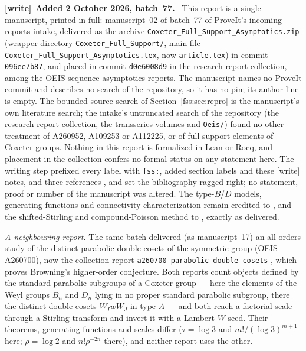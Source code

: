 \documentclass[11pt]{article}
\newenvironment{writenote}[1][]{\par\smallskip\begingroup\small
 \noindent\textbf{[write]}\if\relax\detokenize{#1}\relax\else~\textbf{#1.}\fi\ }%
 {\par\endgroup\smallskip}
\begin{document}
\begin{writenote}[Added 2 October 2026, batch~77]
This report is a single manuscript, printed in full: manuscript~02 of
batch~77 of ProveIt's incoming-reports intake, delivered as the archive
\texttt{Coxeter\_\allowbreak Full\_\allowbreak Support\_\allowbreak Asymptotics.zip} (wrapper directory
\texttt{Coxeter\_\allowbreak Full\_\allowbreak Support/}, main file
\texttt{Coxeter\_\allowbreak Full\_\allowbreak Support\_\allowbreak Asymptotics.tex}, now \texttt{article.tex})
in commit \texttt{096ee7b87}, and placed in commit \texttt{d0e6008d9} in
the research-report collection, among the OEIS-sequence asymptotics
reports. The manuscript names no ProveIt commit and describes no search of
the repository, so it has no pin; its author line is empty. The bounded
source search of Section~\ref{fss:sec:repro} is the manuscript's own
literature search; the intake's untruncated search of the repository (the
research-report collection, the transseries volumes and \texttt{Oeis/})
found no other treatment of A260952, A109253 or A112225, or of full-support
elements of Coxeter groups. Nothing in this report is formalized in Lean or
Rocq, and placement in the collection confers no formal status on any
statement here. The writing step prefixed every label with \texttt{fss:},
added section labels and these \textsf{[write]} notes, and three
references \cite{fss-pdc,fss-tai,fss-cti}, and set the bibliography
ragged-right; no statement, proof or number of
the manuscript was altered. The type-$B$/$D$ models, generating functions
and connectivity characterization remain credited to \cite{BHZ}, and the
shifted-Stirling and compound-Poisson method to \cite{MK}, exactly as
delivered.

\emph{A neighbouring report.} The same batch delivered (as manuscript~17)
an all-orders study of the distinct parabolic double cosets of the
symmetric group (OEIS A260700), now the collection report
\texttt{a260700-\allowbreak parabolic-\allowbreak double-\allowbreak cosets}
\cite{fss-pdc}, which proves Browning's higher-order conjecture. Both
reports count objects defined by the standard parabolic subgroups of a
Coxeter group --- here the elements of the Weyl groups $B_n$ and $D_n$
lying in no proper standard parabolic subgroup, there the distinct double
cosets $W_IwW_J$ in type $A$ --- and both reach a factorial scale through
a Stirling transform and invert it with a Lambert $W$ seed. Their theorems,
generating functions and scales differ ($\tau=\log3$ and
$m!/(\log3)^{m+1}$ here; $\rho=\log2$ and $n!\rho^{-2n}$ there), and neither
report uses the other.


\end{writenote}
\end{document}
